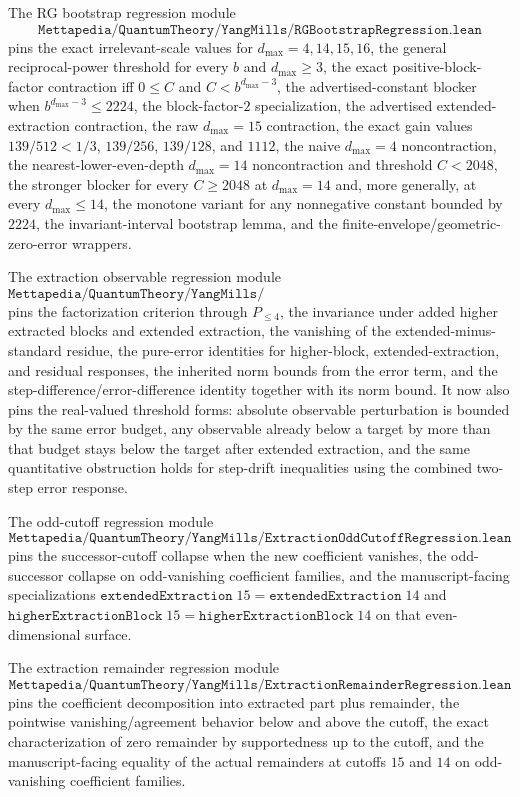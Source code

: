 \documentclass[11pt]{article}
\newcommand{\lean}[1]{\texttt{#1}}
\begin{document}
The RG bootstrap regression module
\[
  \lean{Mettapedia/QuantumTheory/YangMills/RGBootstrapRegression.lean}
\]
pins the exact irrelevant-scale values for \(d_{\max}=4,14,15,16\), the
general reciprocal-power threshold for every \(b\) and \(d_{\max}\ge3\), the
exact positive-block-factor contraction iff \(0\le C\) and
\(C<b^{d_{\max}-3}\), the advertised-constant blocker when
\(b^{d_{\max}-3}\le2224\), the block-factor-\(2\) specialization, the
advertised extended-extraction contraction, the raw
\(d_{\max}=15\) contraction, the exact gain values \(139/512<1/3\),
\(139/256\), \(139/128\), and \(1112\), the naive \(d_{\max}=4\)
noncontraction, the
nearest-lower-even-depth \(d_{\max}=14\) noncontraction and threshold
\(C<2048\), the stronger blocker for every \(C\ge 2048\) at
\(d_{\max}=14\) and, more generally, at every \(d_{\max}\le 14\), the monotone
variant for any nonnegative constant bounded by \(2224\), the
invariant-interval bootstrap lemma, and the finite-envelope/geometric-zero-error
wrappers.

The extraction observable regression module
\[
  \lean{Mettapedia/QuantumTheory/YangMills/ExtractionObservableRegression.lean}
\]
pins the factorization criterion through \(P_{\le 4}\), the invariance under
added higher extracted blocks and extended extraction, the vanishing of the
extended-minus-standard residue, the pure-error identities for higher-block,
extended-extraction, and residual responses, the inherited norm bounds from the
error term, and the step-difference/error-difference identity together with its
norm bound.  It now also pins the real-valued threshold forms: absolute
observable perturbation is bounded by the same error budget, any observable
already below a target by more than that budget stays below the target after
extended extraction, and the same quantitative obstruction holds for
step-drift inequalities using the combined two-step error response.

The odd-cutoff regression module
\[
  \lean{Mettapedia/QuantumTheory/YangMills/ExtractionOddCutoffRegression.lean}
\]
pins the successor-cutoff collapse when the new coefficient vanishes, the
odd-successor collapse on odd-vanishing coefficient families, and the
manuscript-facing specializations
\(\lean{extendedExtraction}\;15=\lean{extendedExtraction}\;14\) and
\(\lean{higherExtractionBlock}\;15=\lean{higherExtractionBlock}\;14\) on that
even-dimensional surface.

The extraction remainder regression module
\[
  \lean{Mettapedia/QuantumTheory/YangMills/ExtractionRemainderRegression.lean}
\]
pins the coefficient decomposition into extracted part plus remainder, the
pointwise vanishing/agreement behavior below and above the cutoff, the exact
characterization of zero remainder by supportedness up to the cutoff, and the
manuscript-facing equality of the actual remainders at cutoffs \(15\) and
\(14\) on odd-vanishing coefficient families.
\end{document}
